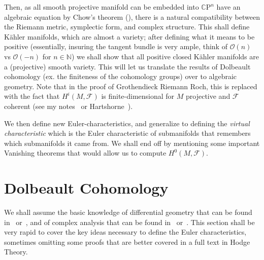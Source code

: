 \documentclass{ut-thesis}
\newcommand{\N}{{\mathbb{N}}}
\newcommand{\CF}{{\mathcal{F}}}
\newcommand{\CO}{{\mathcal{O}}}
\newcommand{\CP}{{\mathbb{C}\mathrm{P}}}
\begin{document}
Then, as all smooth projective manifold can be embedded into $\CP^n$ have an algebraic equation by Chow's
theorem (\cite{hallGAGATheorems2022}), there is a natural compatibility between the Riemann metric, symplectic
form, and complex structure. This shall define K\"ahler manifolds, which are almost a variety; after
defining what it means to be positive (essentially, insuring the tangent bundle is very ample, think of
$\CO(n)$ vs $\CO(-n)$ for $n \in \N$) we shall show that all positive closed K\"ahler manifolds are a
(projective) smooth variety. This will let us translate the results of Dolbeault cohomology (ex. the
finiteness of the cohomology groups) over to algebraic geometry. Note that in the proof of Grothendieck
Riemann Roch, this is replaced with the fact that $H^i(M, \CF)$ is finite-dimensional for $M$ projective and
$\CF$ coherent (see my notes~\cite{NateAlgGeo} or Hartshorne~\cite{hartshorneAlgebraicGeometry2013}).

We then define new Euler-characteristics, and generalize to defining the \emph{virtual characteristic} which
is the Euler characteristic of submanifolds that remembers which submanifolds it came from. We shall end off by mentioning some important Vanishing theorems that would allow us to compute
$H^0(M, \CF)$.



\section{Dolbeault Cohomology}

We shall assume the basic knowledge of differential geometry that can be found in~\cite{NateDiffGeo}
or~\cite{leeIntroductionSmoothManifolds2003}, and of complex analysis that can be found
in~\cite{NateComplexAnalysis} or~\cite{ahlforsComplexAnalysisIntroduction2007}. This section shall be very
rapid to cover the key ideas necessary to define the Euler characteristics, sometimes omitting some proofs
that are better covered in a full text in Hodge Theory.
\end{document}
